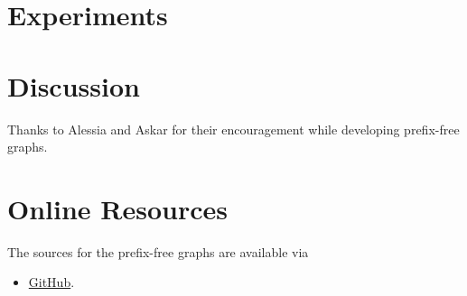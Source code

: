 \documentclass[twocolumn]{ceurart}
\begin{document}
\section{Experiments}
\section{Discussion}

\begin{acknowledgments}
    Thanks to Alessia and Askar for their encouragement while developing prefix-free graphs.
\end{acknowledgments}



\appendix

\section{Online Resources}

The sources for the prefix-free graphs are available via
\begin{itemize}
\item \href{https://github.com/andynet/pfg}{GitHub}.
\end{itemize}
\end{document}
